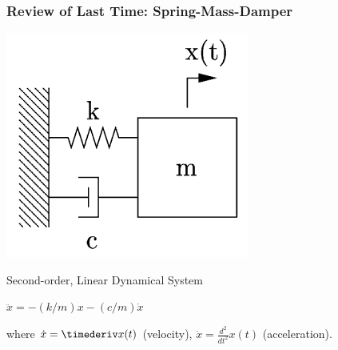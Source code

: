 \documentclass[12pt]{beamer}
\begin{document}
\begin{frame}
\frametitle{Review of Last Time: Spring-Mass-Damper}

\begin{center}
\includegraphics[width=.3\linewidth]{spring-mass-damper.png}
\end{center}

\begin{block}{Second-order, Linear Dynamical System}
\begin{itemize}
\vitem
$\ddot x = -(k/m) x - (c/m) \dot x$
	
\vitem
where $\dot x = \timederiv x(t)$ (velocity), $\ddot x = \frac{d^2}{dt^2} x(t)$ (acceleration).
\end{itemize}
\end{block}

\end{frame}
\end{document}
